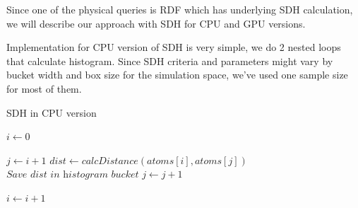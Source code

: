 \documentclass[12pt,letterpaper]{report}
\begin{document}
\noindent\hspace{3em} Since one of the physical queries is RDF which has underlying SDH calculation, we will describe our approach with SDH for CPU and GPU versions.

\noindent\hspace{3em} Implementation for CPU version of SDH is very simple, we do 2 nested loops that calculate histogram. Since SDH criteria and parameters might vary by bucket width and box size for the simulation space, we've used one sample size for most of them.

\begin{algorithm}
\caption{SDH in CPU version}
\label{alg:sdhcpu}
\begin{algorithmic}[1]

\State $\textit{i} \gets 0$

\State $\textit{j} \gets i + 1$
\State $\textit{dist} \gets calcDistance(atoms[i], atoms[j])$
\State $\textit{Save dist in histogram bucket}$
\State
\State $\textit{j} \gets j + 1$
\EndWhile

\State $\textit{i} \gets i + 1$
\EndWhile

\EndProcedure

\end{algorithmic}
\end{algorithm}
\end{document}
